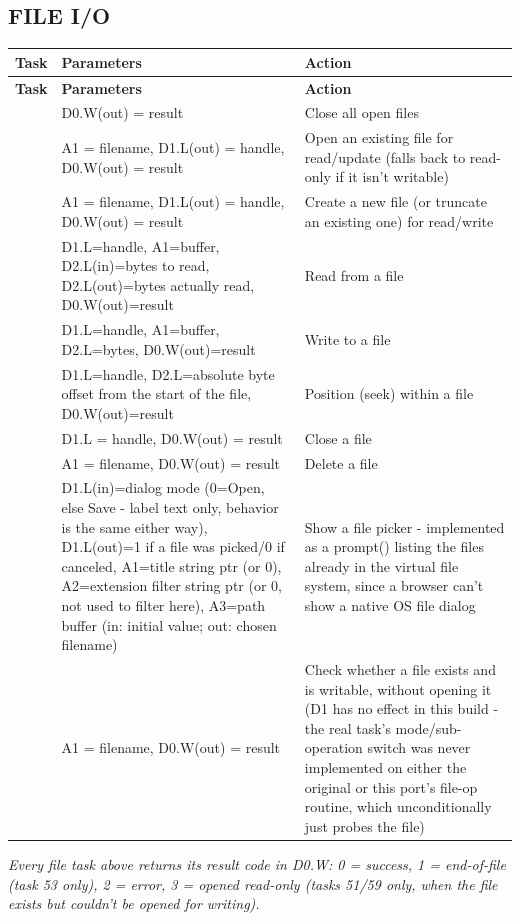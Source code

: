 \subsection*{FILE I/O}
\begin{longtable}{@{}p{1.7cm}p{5.2cm}p{7.3cm}@{}}
\toprule
\textbf{Task} & \textbf{Parameters} & \textbf{Action} \\
\midrule
\endfirsthead
\toprule
\textbf{Task} & \textbf{Parameters} & \textbf{Action} \\
\midrule
\endhead
\ttfamily 50 & D0.W(out) = result & Close all open files \\
\ttfamily 51 & A1 = filename, D1.L(out) = handle, D0.W(out) = result & Open an existing file for read/update (falls back to read-only if it isn't writable) \\
\ttfamily 52 & A1 = filename, D1.L(out) = handle, D0.W(out) = result & Create a new file (or truncate an existing one) for read/write \\
\ttfamily 53 & D1.L=handle, A1=buffer, D2.L(in)=bytes to read, D2.L(out)=bytes actually read, D0.W(out)=result & Read from a file \\
\ttfamily 54 & D1.L=handle, A1=buffer, D2.L=bytes, D0.W(out)=result & Write to a file \\
\ttfamily 55 & D1.L=handle, D2.L=absolute byte offset from the start of the file, D0.W(out)=result & Position (seek) within a file \\
\ttfamily 56 & D1.L = handle, D0.W(out) = result & Close a file \\
\ttfamily 57 & A1 = filename, D0.W(out) = result & Delete a file \\
\ttfamily 58 & D1.L(in)=dialog mode (0=Open, else Save - label text only, behavior is the same either way), D1.L(out)=1 if a file was picked/0 if canceled, A1=title string ptr (or 0), A2=extension filter string ptr (or 0, not used to filter here), A3=path buffer (in: initial value; out: chosen filename) & Show a file picker - implemented as a prompt() listing the files already in the virtual file system, since a browser can't show a native OS file dialog \\
\ttfamily 59 & A1 = filename, D0.W(out) = result & Check whether a file exists and is writable, without opening it (D1 has no effect in this build - the real task's mode/sub-operation switch was never implemented on either the original or this port's file-op routine, which unconditionally just probes the file) \\
\bottomrule
\end{longtable}
\par\noindent\textit{Every file task above returns its result code in D0.W: 0 = success, 1 = end-of-file (task 53 only), 2 = error, 3 = opened read-only (tasks 51/59 only, when the file exists but couldn't be opened for writing).}\par\medskip
